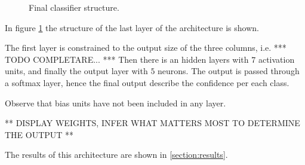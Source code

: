 \begin{figure}
            \caption{Final classifier structure.}\label{fig:mc-cnn:final-classifier-structure}
        \end{figure}
        \par{
            In figure \ref{fig:mc-cnn:final-classifier-structure} the structure of the last layer of the architecture is shown.
        }
        \par{
            The first layer is constrained to the output size of the three columns, i.e. *** TODO COMPLETARE... *** Then there is an hidden layers with $7$ activation units, and finally the output layer with $5$ neurons. The output is passed through a softmax layer, hence the final output describe the confidence per each class.
        }
        \par{
            Observe that bias units have not been included in any layer.
        }
        \par{
            ** DISPLAY WEIGHTS, INFER WHAT MATTERS MOST TO DETERMINE THE OUTPUT **
        }
        \par{
            The results of this architecture are shown in \ref{section:results}.
        }
